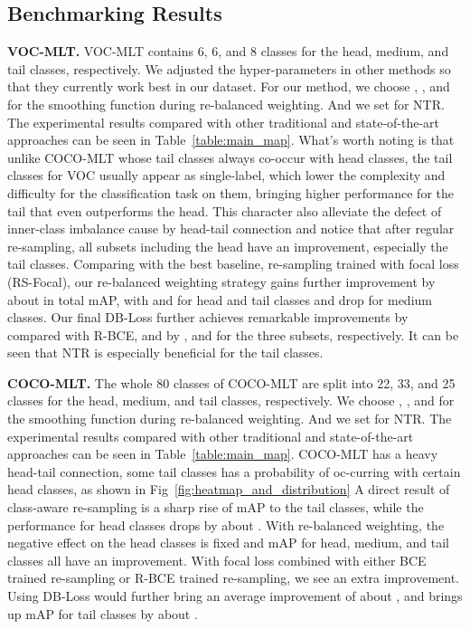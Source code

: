 \documentclass[runningheads]{llncs}
\begin{document}
\subsection{Benchmarking Results} 

\noindent\textbf{VOC-MLT.}
VOC-MLT contains 6, 6, and 8 classes for the head, medium, and tail classes, respectively. 
We adjusted the hyper-parameters in other methods so that they currently work best in our dataset.
For our method, we choose , , and  for the smoothing function during re-balanced weighting.
And we set  for NTR.
The experimental results compared with other traditional and state-of-the-art approaches can be seen in Table~\ref{table:main_map}.
What's worth noting is that unlike COCO-MLT whose tail classes always co-occur with head classes, the tail classes for VOC usually appear as single-label, which lower the complexity and difficulty for the classification task on them, bringing higher performance for the tail that even outperforms the head.
This character also alleviate the defect of inner-class imbalance cause by head-tail connection and notice that after regular re-sampling, all subsets including the head have an improvement, especially the tail classes.
Comparing with the best baseline, re-sampling trained with focal loss (RS-Focal), our re-balanced weighting strategy gains further improvement by about  in total mAP, with  and  for head and tail classes and drop  for medium classes.
Our final DB-Loss further achieves remarkable improvements by  compared with R-BCE, and by ,  and  for the three subsets, respectively. It can be seen that NTR is especially beneficial for the tail classes.

\noindent\textbf{COCO-MLT.}
The whole 80 classes of COCO-MLT are split into 22, 33, and 25 classes for the head, medium, and tail classes, respectively.
We choose , , and  for the smoothing function during re-balanced weighting.
And we set  for NTR.
The experimental results compared with other traditional and state-of-the-art approaches can be seen in Table~\ref{table:main_map}.
COCO-MLT has a heavy head-tail connection, \ie some tail classes has a  probability of oc-curring with certain head classes, as shown in Fig~\ref{fig:heatmap_and_distribution} A direct result of class-aware re-sampling is a sharp rise of mAP to the tail classes, while the performance for head classes drops by about . With re-balanced weighting, the negative effect on the head classes is fixed and mAP for head, medium, and tail classes all have an improvement.
With focal loss combined with either BCE trained re-sampling or R-BCE trained re-sampling, we see an extra improvement.
Using DB-Loss would further bring an average improvement of about , and brings up mAP for tail classes by about .
\end{document}
